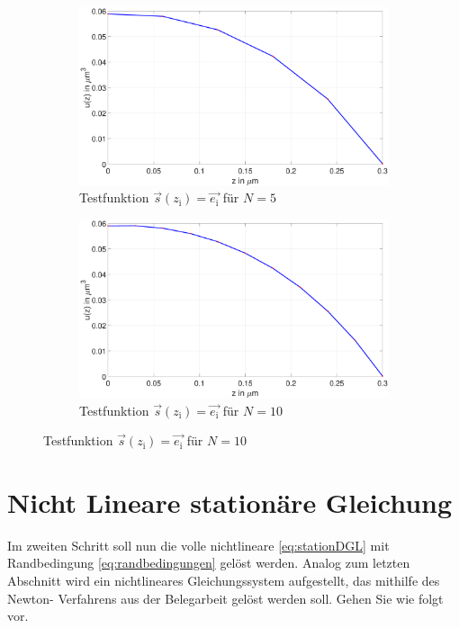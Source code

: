 \begin{figure}[htb]
\newline
\begin{subfigure}[b]{.5\textwidth}
		\centering
	\includegraphics[width=1\linewidth]{figures/station_gl_2_1/aufgabe_7_test_n5}
	\caption{Testfunktion $\vec{s}(z_\mathrm{i})=\vec{e_\mathrm{i}}$ für $N=5$}
\end{subfigure}
\begin{subfigure}[b]{.5\textwidth}
	\centering
	\includegraphics[width=1\linewidth]{figures/station_gl_2_1/aufgabe_7_test_n10}
	\caption{Testfunktion $\vec{s}(z_\mathrm{i})=\vec{e_\mathrm{i}}$ für $N=10$}
\end{subfigure}
\end{figure}
\clearpage
\section{Nicht Lineare stationäre Gleichung}
\begin{mybox}
	Im zweiten Schritt soll nun die volle nichtlineare \cref{eq:stationDGL} mit Randbedingung \cref{eq:randbedingungen} gelöst werden. Analog
	zum letzten Abschnitt wird ein nichtlineares Gleichungssystem aufgestellt, das mithilfe des Newton-
	Verfahrens aus der Belegarbeit gelöst werden soll. Gehen Sie wie folgt vor.\cite{Prof.Dr.AndreasZeiser.April2021}
\end{mybox}

